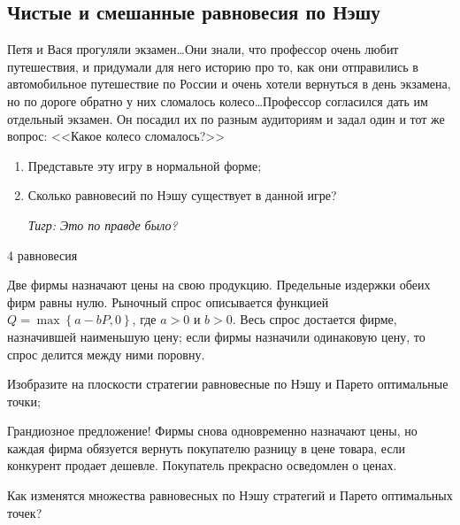 

\subsection{Чистые и смешанные равновесия по Нэшу}

\begin{problem}\par
Петя и Вася прогуляли экзамен\ldots Они знали, что профессор очень любит путешествия, и придумали для него историю про то, как они отправились в автомобильное путешествие по России и очень хотели вернуться в день экзамена, но по дороге обратно у них сломалось колесо\ldots Профессор согласился дать им отдельный экзамен. Он посадил их по разным аудиториям и задал один и тот же вопрос: <<Какое колесо сломалось?>>\par
\begin{enumerate}
\item 	Представьте эту игру в нормальной форме;\par
\item 	Сколько равновесий по Нэшу существует в данной игре?\par
{\it Тигр: Это по правде было?}\par
\end{enumerate}


\begin{sol}
4 равновесия
\end{sol}
\end{problem}



\begin{problem}
Две фирмы назначают цены на свою продукцию. Предельные издержки обеих фирм равны нулю. Рыночный спрос описывается функцией  $Q=\max \left\{a-bP,0\right\}$, где  $a>0$  и  $b>0$. Весь спрос достается фирме, назначившей наименьшую цену; если фирмы назначили одинаковую цену, то спрос делится между ними поровну.\par
Изобразите на плоскости стратегии равновесные по Нэшу и Парето оптимальные точки;



\begin{sol}

\end{sol}
\end{problem}



\begin{problem}\par
Грандиозное предложение! Фирмы снова одновременно назначают цены, но каждая фирма обязуется вернуть покупателю разницу в цене товара, если конкурент продает дешевле. Покупатель прекрасно осведомлен о ценах.\par
	Как изменятся множества равновесных по Нэшу стратегий и Парето оптимальных точек?



\begin{sol}

\end{sol}
\end{problem}



